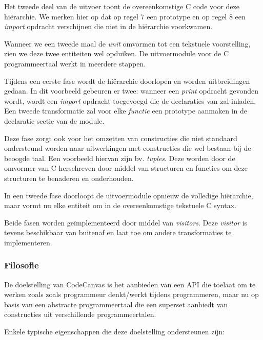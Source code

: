 Het tweede deel van de uitvoer toont de overeenkomstige C code voor deze
hi\"erarchie. We merken hier op dat op regel 7 een prototype en op regel 8 een
\emph{import} opdracht verschijnen die niet in de hi\"erarchie voorkwamen.

Wanneer we een tweede maal de \emph{unit} omvormen tot een tekstuele
voorstelling, zien we deze twee entiteiten wel opduiken. De uitvoermodule voor
de C programmeertaal werkt in meerdere stappen. 

Tijdens een eerste fase wordt de hi\"erarchie doorlopen en worden uitbreidingen
gedaan. In dit voorbeeld gebeuren er twee: wanneer een \emph{print} opdracht
gevonden wordt, wordt een \emph{import} opdracht toegevoegd die de declaraties
van  zal inladen. Een tweede transformatie zal voor elke
\emph{functie} een prototype aanmaken in de declaratie sectie van de module.

Deze fase zorgt ook voor het omzetten van constructies die niet standaard
ondersteund worden naar uitwerkingen met constructies die wel bestaan bij de
beoogde taal. Een voorbeeld hiervan zijn bv. \emph{tuples}. Deze worden door de
omvormer van C herschreven door middel van structuren en functies om deze
structuren te benaderen en onderhouden.

In een tweede fase doorloopt de uitvoermodule opnieuw de volledige
hi\"erarchie, maar vormt nu elke entiteit om in de overeenkomstige tekstuele C
syntax.

Beide fasen worden ge\"implementeerd door middel van \emph{visitors}. Deze
\emph{visitor} is tevens beschikbaar van buitenaf en laat toe om andere
transformaties te implementeren.

\subsubsection{Filosofie}

De doelstelling van CodeCanvas is het aanbieden van een API die toelaat om te
werken zoals zoals programmeur denkt/werkt tijdens programmeren, maar nu op
basis van een abstracte programmeertaal die een superset aanbiedt van
constructies uit verschillende programmeertalen.

Enkele typische eigenschappen die deze doelstelling ondersteunen zijn:


